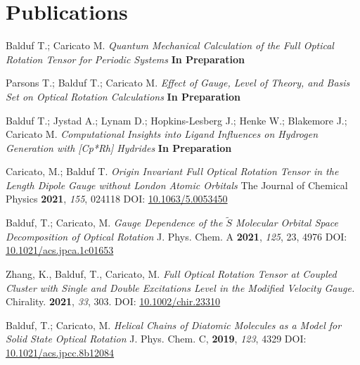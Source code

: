 \documentclass[a4paper,11pt]{article}
\begin{document}
\section{Publications}
  \begin{etaremune}
  
  \item Balduf T.; Caricato M. \textit{Quantum Mechanical Calculation of the Full Optical Rotation Tensor for Periodic Systems} \textbf{In Preparation}
  
  \item Parsons T.; Balduf T.; Caricato M. \textit{Effect of Gauge, Level of Theory, and Basis Set on Optical Rotation Calculations} \textbf{In Preparation}
  
  \item Balduf T.; Jystad A.; Lynam D.; Hopkins-Lesberg J.;  Henke W.; Blakemore J.; Caricato M. \textit{Computational Insights into Ligand Influences on Hydrogen Generation with [Cp*Rh] Hydrides} \textbf{In Preparation}
  
  \item Caricato, M.; Balduf T. \textit{Origin Invariant Full Optical Rotation Tensor in the Length Dipole Gauge without London Atomic Orbitals} The Journal of Chemical Physics \textbf{2021}, \textit{155}, 024118 DOI: \href{https://doi.org/10.1063/5.0053450}{10.1063/5.0053450} 
  
  \item Balduf, T.; Caricato, M. \textit{Gauge Dependence of the $\tilde{S}$ Molecular Orbital Space Decomposition of Optical Rotation} J. Phys. Chem. A \textbf{2021}, \textit{125}, 23, 4976 DOI: \href{https://doi.org/10.1021/acs.jpca.1c01653}{10.1021/acs.jpca.1c01653} 
  
  \item Zhang, K., Balduf, T., Caricato, M. \textit{Full Optical Rotation Tensor at Coupled Cluster with Single and Double Excitations Level in the Modified Velocity Gauge.} Chirality. \textbf{2021}, \textit{33}, 303. DOI:   \href{https://doi.org/10.1002/chir.23310}{10.1002/chir.23310}
  
  \item Balduf, T.; Caricato, M. \textit{Helical Chains of Diatomic Molecules as a Model for Solid State Optical Rotation} J. Phys. Chem. C, \textbf{2019}, \textit{123}, 4329 DOI: \href{https://doi.org/10.1021/acs.jpcc.8b12084}{10.1021/acs.jpcc.8b12084} 
  \end{etaremune}
\vspace{-5pt}
	    
\end{document}

